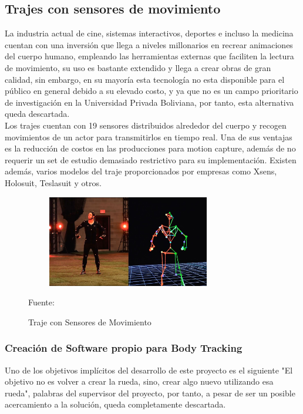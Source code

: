 \subsection{Trajes con sensores de movimiento}

La industria actual de cine, sistemas interactivos, deportes e incluso la medicina cuentan con una inversión que llega a niveles millonarios en recrear animaciones del cuerpo humano, empleando las herramientas externas que faciliten la lectura de movimiento, su uso es bastante extendido y llega a crear obras de gran calidad, sin embargo, en su mayoría esta tecnología no esta disponible para el público en general debido a su elevado costo, y ya que no es un campo prioritario de investigación en la Universidad Privada Boliviana, por tanto, esta alternativa queda descartada.
\\
Los trajes cuentan con 19 sensores distribuidos alrededor del cuerpo y recogen movimientos de un actor para transmitirlos en tiempo real. Una de sus ventajas es la reducción de costos en las producciones para motion capture, además de no requerir un set de estudio demasiado restrictivo para su implementación. Existen además, varios modelos del traje proporcionados por empresas como Xsens, Holosuit, Teslasuit y otros.

\begin{figure}[t!]
	\centering
	\includegraphics[width=9cm,height=4cm,]{./Images/trajesensor.jpg}
	\caption{Traje con Sensores de Movimiento}
	\footnotesize Fuente: \cite{trajesensor}
	\label{trajesensores}
\end{figure}

\subsubsection{Creación de Software propio para Body Tracking}

Uno de los objetivos implícitos del desarrollo de este proyecto es el siguiente "El objetivo no es volver a crear la rueda, sino, crear algo nuevo utilizando esa rueda", palabras del supervisor del proyecto, por tanto, a pesar de ser un posible acercamiento a la solución, queda completamente descartada.

